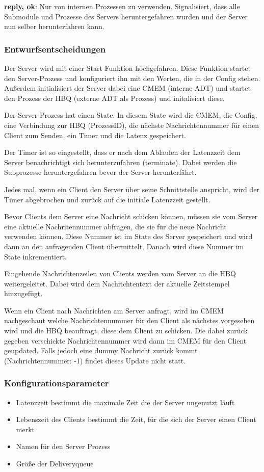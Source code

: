 \documentclass{article}
\begin{document}
\textbf{{reply, ok}}: Nur von internen Prozessen zu verwenden. Signalisiert, dass alle Submodule und Prozesse des Servers
heruntergefahren wurden und der Server nun selber herunterfahren kann.\\

\subsubsection{Entwurfsentscheidungen}
Der Server wird mit einer Start Funktion hochgefahren. Diese Funktion startet den Server-Prozess und konfiguriert ihn
mit den Werten, die in der Config stehen. Außerdem initialisiert der Server dabei eine CMEM (interne ADT) und startet
den Prozess der HBQ (externe ADT als Prozess) und initalisiert diese.

Der Server-Prozess hat einen State. In diesem State wird die CMEM, die Config, eine Verbindung zur HBQ (ProzessID),
die nächste Nachrichtennummer für einen Client zum Senden, ein Timer und die Latenz gespeichert.

Der Timer ist so eingestellt, dass er nach dem Ablaufen der Latenzzeit dem Server benachrichtigt sich herunterzufahren
(terminate). Dabei werden die Subprozesse heruntergefahren bevor der Server herunterfährt.

Jedes mal, wenn ein Client den Server über seine Schnittstelle anspricht, wird der Timer abgebrochen und zurück auf die
initiale Latenzzeit gestellt.

Bevor Clients dem Server eine Nachricht schicken können, müssen sie vom Server eine aktuelle Nachritennummer abfragen,
die sie für die neue Nachricht verwenden können. Diese Nummer ist im State des Server gespeichert und wird dann an den
anfragenden Client übermittelt. Danach wird diese Nummer im State inkrementiert.

Eingehende Nachrichtenzeilen von Clients werden vom Server an die HBQ weitergeleitet. Dabei wird dem Nachrichtentext der
aktuelle Zeitstempel hinzugefügt.

Wenn ein Client nach Nachrichten am Server anfragt, wird im CMEM nachgeschaut welche Nachrichtennummer für den Client
als nächstes vorgesehen wird und die HBQ beauftragt, diese dem Client zu schicken. Die dabei zurück gegeben verschickte
Nachrichtennummer wird dann im CMEM für den Client geupdated. Falls jedoch eine dummy Nachricht zurück kommt
(Nachrichtennummer: -1) findet dieses Update nicht statt.
			
\subsubsection{Konfigurationsparameter}
\begin{itemize}
    \item Latenzzeit bestimmt die maximale Zeit die der Server ungenutzt läuft
    \item Lebenszeit des Clients bestimmt die Zeit, für die sich der Server einen Client merkt
    \item Namen für den Server Prozess
    \item Größe der Deliveryqueue
\end{itemize}
\end{document}

